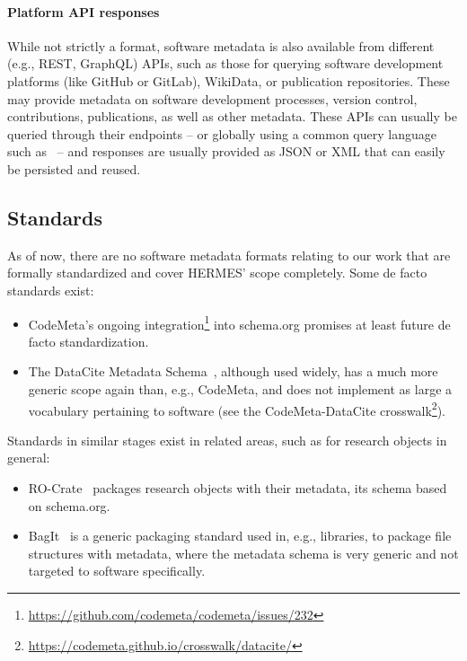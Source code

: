 \documentclass[11pt,a4paper]{scrartcl}
\begin{document}
\paragraph{Platform API responses}\label{par:metadata-formats-apis}
While not strictly a format, software metadata is also available from different (e.g., REST, GraphQL) APIs, such as those for querying software
development platforms (like GitHub or GitLab), WikiData, or publication repositories. These may provide metadata on software development
processes, version control, contributions, publications, as well as other metadata. These APIs can usually be queried through their
endpoints -- or globally using a common query language such as~\cite{W3C-SPARQL} -- and responses are usually provided as JSON or XML
that can easily be persisted and reused.




\subsection{Standards}\label{subsec:metadata-standards}
As of now, there are no software metadata formats relating to our work that are formally standardized and cover HERMES’
scope completely. Some de facto standards exist:

\begin{itemize}
    \item CodeMeta’s ongoing integration\footnote{\url{https://github.com/codemeta/codemeta/issues/232}} into schema.org
          promises at least future de facto standardization. 
    \item The DataCite Metadata Schema~\cite{DataCiteSchema}, although used widely, has a much more generic scope again
          than, e.g., CodeMeta, and does not implement as large a vocabulary pertaining to software 
          (see the CodeMeta-DataCite crosswalk\footnote{\url{https://codemeta.github.io/crosswalk/datacite/}}).
\end{itemize}

Standards in similar stages exist in related areas, such as for research objects in general: 
\begin{itemize}
    \item RO-Crate~\cite{RO-Crate} packages research objects with their metadata, its schema based on schema.org.
    \item BagIt~\cite{BagItRFC} is a generic packaging standard used in, e.g., libraries, to package file structures with
          metadata, where the metadata schema is very generic and not targeted to software specifically.
\end{itemize}
\end{document}
